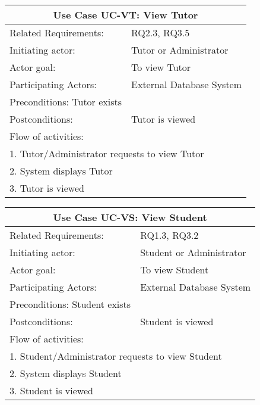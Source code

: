 \documentclass[12pt]{article}
\begin{document}
{		\begin{tabular}{| l | p{10cm}| }
			\hline\multicolumn{2}{|c|}{ \textbf{Use Case UC-VT: View Tutor}} \\ \hline
			Related Requirements: & RQ2.3, RQ3.5 \\ \hline
			Initiating actor: & Tutor or Administrator \\ \hline
			Actor goal: & To view Tutor\\ \hline
			Participating Actors: & External Database System\\ \hline
			Preconditions: Tutor exists\\ \hline
			Postconditions: & Tutor is viewed\\ \hline
			\multicolumn{2}{|l|}{Flow of activities:}\\ \hline
			\multicolumn{2}{|p{15cm}|}{1. Tutor/Administrator requests to view Tutor}\\
			\multicolumn{2}{|p{15cm}|}{2. System displays Tutor}\\
			\multicolumn{2}{|l|}{3. Tutor is viewed}	
			\\ \hline		
		\end{tabular}	
		
		\begin{tabular}{| l | p{10cm}| }
			\hline\multicolumn{2}{|c|}{ \textbf{Use Case UC-VS: View Student}} \\ \hline
			Related Requirements: & RQ1.3, RQ3.2 \\ \hline
			Initiating actor: & Student or Administrator \\ \hline
			Actor goal: & To view Student\\ \hline
			Participating Actors: & External Database System\\ \hline
			Preconditions: Student exists\\ \hline
			Postconditions: & Student is viewed\\ \hline
			\multicolumn{2}{|l|}{Flow of activities:}\\ \hline
			\multicolumn{2}{|p{15cm}|}{1. Student/Administrator requests to view Student}\\
			\multicolumn{2}{|p{15cm}|}{2. System displays Student}\\
			\multicolumn{2}{|l|}{3. Student is viewed}	
			\\ \hline		
		\end{tabular}	
		
		}
	\newpage	
\end{document}

